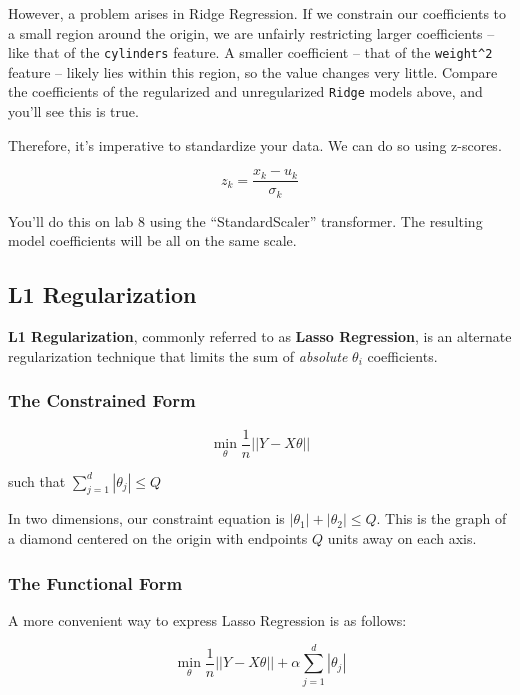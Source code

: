 \documentclass[
  letterpaper,
  DIV=11,
  numbers=noendperiod]{scrreprt}
\begin{document}
However, a problem arises in Ridge Regression. If we constrain our
coefficients to a small region around the origin, we are unfairly
restricting larger coefficients -- like that of the \texttt{cylinders}
feature. A smaller coefficient -- that of the \texttt{weight\^{}2}
feature -- likely lies within this region, so the value changes very
little. Compare the coefficients of the regularized and unregularized
\texttt{Ridge} models above, and you'll see this is true.

Therefore, it's imperative to standardize your data. We can do so using
z-scores.

\[z_k = \frac{x_k - u_k}{\sigma_k}\]

You'll do this on lab 8 using the ``StandardScaler'' transformer. The
resulting model coefficients will be all on the same scale.

\hypertarget{l1-regularization}{%
\subsection{L1 Regularization}\label{l1-regularization}}

\textbf{L1 Regularization}, commonly referred to as \textbf{Lasso
Regression}, is an alternate regularization technique that limits the
sum of \emph{absolute} \(\theta_i\) coefficients.

\hypertarget{the-constrained-form-1}{%
\subsubsection{The Constrained Form}\label{the-constrained-form-1}}

\[\min_{\theta} \frac{1}{n} || Y - X\theta ||\]

such that \(\sum_{j=1}^{d} |\theta_j| \le Q\)

In two dimensions, our constraint equation is
\(|\theta_1| + |\theta_2| \le Q\). This is the graph of a diamond
centered on the origin with endpoints \(Q\) units away on each axis.

\hypertarget{the-functional-form-1}{%
\subsubsection{The Functional Form}\label{the-functional-form-1}}

A more convenient way to express Lasso Regression is as follows:

\[\min_{\theta} \frac{1}{n} || Y - X\theta || + \alpha \sum_{j=1}^{d} |\theta_j|\]
\end{document}
